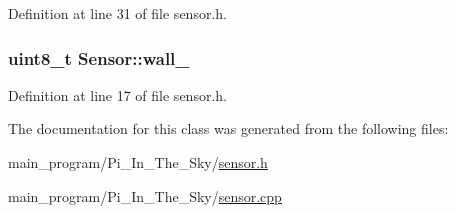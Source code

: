 Definition at line 31 of file sensor.\+h.

\subsubsection[{\texorpdfstring{wall\+\_\+}{wall_}}]{\setlength{\rightskip}{0pt plus 5cm}uint8\+\_\+t Sensor\+::wall\+\_\+}\hypertarget{class_sensor_a09506b22991de665b8e85727bfced262}{}\label{class_sensor_a09506b22991de665b8e85727bfced262}


Definition at line 17 of file sensor.\+h.



The documentation for this class was generated from the following files\+:\begin{DoxyCompactItemize}
\item 
main\+\_\+program/\+Pi\+\_\+\+In\+\_\+\+The\+\_\+\+Sky/\hyperlink{sensor_8h}{sensor.\+h}\item 
main\+\_\+program/\+Pi\+\_\+\+In\+\_\+\+The\+\_\+\+Sky/\hyperlink{sensor_8cpp}{sensor.\+cpp}\end{DoxyCompactItemize}
